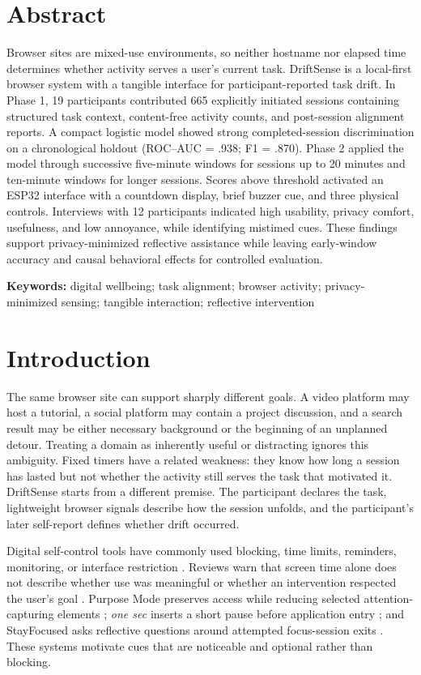 \documentclass[12pt,a4paper]{article}
\newcommand{\citep}[1]{\parencite{#1}}
\begin{document}
\section*{Abstract}
\noindent Browser sites are mixed-use environments, so neither hostname nor elapsed time determines whether activity serves a user's current task. DriftSense is a local-first browser system with a tangible interface for participant-reported task drift. In Phase 1, 19 participants contributed 665 explicitly initiated sessions containing structured task context, content-free activity counts, and post-session alignment reports. A compact logistic model showed strong completed-session discrimination on a chronological holdout (ROC--AUC = .938; F1 = .870). Phase 2 applied the model through successive five-minute windows for sessions up to 20 minutes and ten-minute windows for longer sessions. Scores above threshold activated an ESP32 interface with a countdown display, brief buzzer cue, and three physical controls. Interviews with 12 participants indicated high usability, privacy comfort, usefulness, and low annoyance, while identifying mistimed cues. These findings support privacy-minimized reflective assistance while leaving early-window accuracy and causal behavioral effects for controlled evaluation.

\vspace{6pt}
\noindent\textbf{Keywords:} digital wellbeing; task alignment; browser activity; privacy-minimized sensing; tangible interaction; reflective intervention

\section{Introduction}

The same browser site can support sharply different goals. A video platform may host a tutorial, a social platform may contain a project discussion, and a search result may be either necessary background or the beginning of an unplanned detour. Treating a domain as inherently useful or distracting ignores this ambiguity. Fixed timers have a related weakness: they know how long a session has lasted but not whether the activity still serves the task that motivated it. DriftSense starts from a different premise. The participant declares the task, lightweight browser signals describe how the session unfolds, and the participant's later self-report defines whether drift occurred.

Digital self-control tools have commonly used blocking, time limits, reminders, monitoring, or interface restriction \citep{lyngs2019selfcontrol,biedermann2021digital,roffarello2023digital}. Reviews warn that screen time alone does not describe whether use was meaningful or whether an intervention respected the user's goal \citep{almoallim2022functionalities,rahmillah2023apps}. Purpose Mode preserves access while reducing selected attention-capturing elements \citep{lee2025purpose}; \textit{one sec} inserts a short pause before application entry \citep{gruning2023onesec}; and StayFocused asks reflective questions around attempted focus-session exits \citep{li2024stayfocused}. These systems motivate cues that are noticeable and optional rather than blocking.
\end{document}
